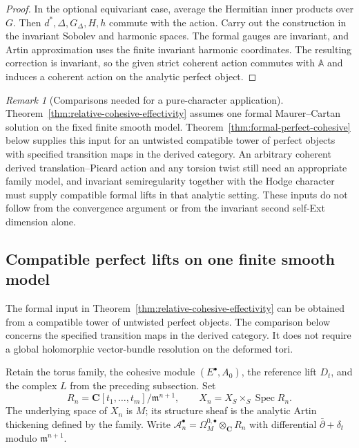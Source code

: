 \documentclass[11pt]{article}
\theoremstyle{definition}
\theoremstyle{remark}
\newtheorem{remark}[theorem]{Remark}
\newcommand{\C}{\mathbf C}
\begin{document}
\begin{proof}
In the optional equivariant case, average the Hermitian inner
products over $G$.  Then $d^*,\Delta,G_\Delta,H,h$ commute with
the action.  Carry out the construction in the invariant
Sobolev and harmonic spaces.  The formal gauges are invariant,
and Artin approximation uses the finite invariant harmonic
coordinates.  The resulting correction is invariant, so the
given strict coherent action commutes with $\mathbb A$ and
induces a coherent action on the analytic perfect object.
\end{proof}

\begin{remark}[Comparisons needed for a pure-character application]
\label{rem:relative-cohesive-comparisons}
Theorem~\ref{thm:relative-cohesive-effectivity} assumes one formal
Maurer--Cartan solution on the fixed finite smooth model.
Theorem~\ref{thm:formal-perfect-cohesive} below supplies this input
for an untwisted compatible tower of perfect objects with specified
transition maps in the derived category. An arbitrary coherent
derived translation--Picard action and any torsion twist still need
an appropriate family model, and invariant semiregularity together
with the Hodge character must supply compatible formal lifts in that
analytic setting. These inputs do not follow from the convergence
argument or from the invariant second self-Ext dimension alone.
\end{remark}

\subsection{Compatible perfect lifts on one finite smooth model}
\label{subsec:formal-perfect-cohesive}

The formal input in Theorem~\ref{thm:relative-cohesive-effectivity}
can be obtained from a compatible tower of untwisted perfect objects.
The comparison below concerns the specified transition maps in the
derived category.  It does not require a global holomorphic
vector-bundle resolution on the deformed tori.

Retain the torus family, the cohesive module $(E^\bullet,A_0)$,
the reference lift $D_t$, and the complex $L$ from the preceding
subsection.  Set
\[
 R_n=\C[t_1,\ldots,t_m]/\mathfrak m^{n+1},
 \qquad X_n=X_S\times_S\operatorname{Spec}R_n.
\]
The underlying space of $X_n$ is $M$; its structure sheaf is the
analytic Artin thickening defined by the family.  Write
$\mathcal A_n^\bullet=\Omega_M^{0,\bullet}\otimes_\C R_n$ with
differential $\bar\partial+\delta_t$ modulo $\mathfrak m^{n+1}$.
\end{document}
